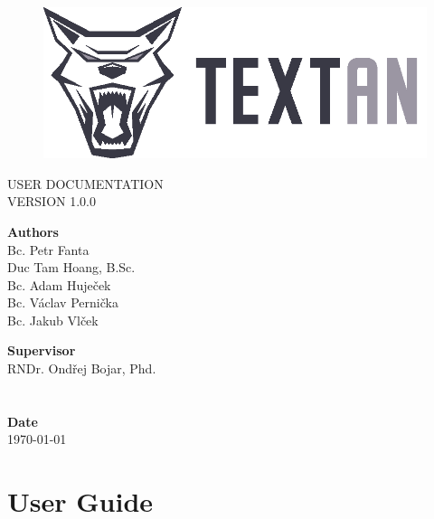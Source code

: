 \documentclass[12pt,a4paper]{report}
\begin{document}
\begin{titlepage}
\BgThispage
{}

\begin{figure}
 \includegraphics{../Logos/TEXTAN_logo_grey_B}
\end{figure}
\noindent
\textcolor{TextanRed}{\chapterfont\fontsize{48pt}{1pt}\selectfont\MakeUppercase{User documentation}}\\[15pt]
\textcolor{TextanDarkRed}{\sectionfont\LARGE\MakeUppercase{Version 1.0.0}}

\vfill
\noindent
\begin{minipage}[b]{.65\textwidth}
\textbf{Authors}\\
Bc. Petr Fanta\\
Duc Tam Hoang, B.Sc.\\
Bc. Adam Huječek\\
Bc. Václav Pernička\\
Bc. Jakub Vlček
\end{minipage}%
\begin{minipage}[b]{.35\textwidth}
\textbf{Supervisor} \\
RNDr. Ondřej Bojar, Phd.\\
\\
\\
\textbf{Date}\\
\today
\end{minipage}

\end{titlepage}
\restoregeometry

\tableofcontents


\chapter{User Guide}
\end{document}
